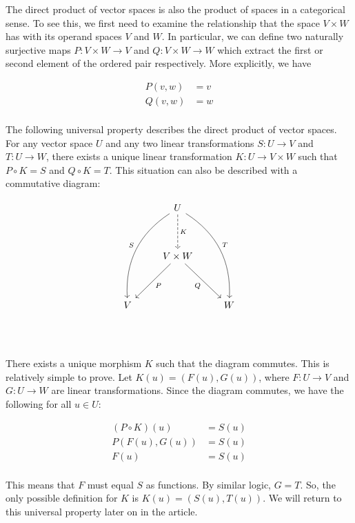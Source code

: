 \documentclass[12pt, titlepage]{article}
\begin{document}
The direct product of vector spaces is also the product of spaces in a
categorical sense. To see this, we first need to examine the relationship that
the space $V \times W$ has with its operand spaces $V$ and $W$. In particular,
we can define two naturally surjective maps $P : V \times W \to V$ and $Q : V
\times W \to W$ which extract the first or second element of the ordered pair
respectively. More explicitly, we have

\begin{displaymath}
  \begin{aligned}
    P(v, w) & = v \\
    Q(v, w) & = w \\
  \end{aligned}
\end{displaymath}

The following universal property describes the direct product of vector spaces.
For any vector space $U$ and any two linear transformations $S : U \to V$ and
$T : U \to W$, there exists a unique linear transformation $K : U \to V \times
W$ such that $P \circ K = S$ and $Q \circ K = T$. This situation can also be
described with a commutative diagram:

\begin{displaymath}
  \begin{tikzcd}[row sep=huge]
    & U \ar[ddl, bend right, "S"'] \ar[ddr, bend left, "T"] \ar[d, dashed, "K"] & \\
    & V \times W \ar[dl, "P"] \ar[dr, "Q"'] & \\
    V & & W \\
  \end{tikzcd}
\end{displaymath}

There exists a unique morphism $K$ such that the diagram commutes. This is
relatively simple to prove. Let $K(u) = (F(u), G(u))$, where $F : U \to V$ and
$G : U \to W$ are linear transformations. Since the diagram commutes, we have
the following for all $u \in U$:

\begin{displaymath}
  \begin{aligned}
    (P \circ K)(u) & = S(u) \\
    P(F(u), G(u))  & = S(u) \\
    F(u)           & = S(u) \\
  \end{aligned}
\end{displaymath}

This means that $F$ must equal $S$ as functions. By similar logic, $G = T$. So,
the only possible definition for $K$ is $K(u) = (S(u), T(u))$. We will return
to this universal property later on in the article.
\end{document}
